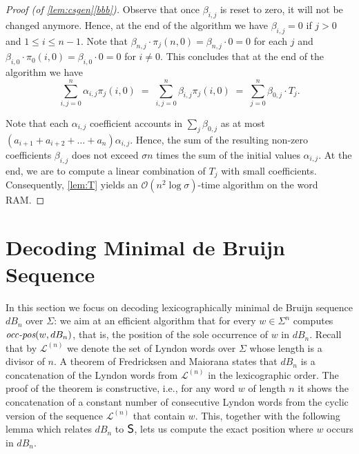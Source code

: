 \documentclass{article}
\newcommand{\mayqed}{}
\newcommand{\Oh}{\mathcal{O}}
\newcommand{\dB}{dB}
\newcommand{\occ}{\mbox{\it occ-pos}}
\renewcommand{\L}{{\mathcal{L}}}
\newcommand{\CS}{\mbox{\large{\sf{S}}}}
\theoremstyle{definition}
\theoremstyle{remark}
\begin{document}
\begin{proof}[Proof (of \cref{lem:csgen}\ref{bbb})]
  Observe that once $\beta_{i,j}$ is reset to zero, it will not be changed anymore.
  Hence, at the end of the algorithm we have $\beta_{i,j}=0$ if $j>0$ and $1\le i \le n-1$. Note that $\beta_{n,j}\cdot \pi_j(n,0)=\beta_{n,j}\cdot 0 = 0$
  for each $j$ and $\beta_{i,0}\cdot \pi_0(i,0) = \beta_{i,0} \cdot 0 = 0$ for $i\ne 0$.
  This concludes that at the end of the algorithm we have
  $$ \sum_{i,j=0}^n \alpha_{i,j} \pi_j(i,0)\;=\;\sum_{i,j=0}^n \beta_{i,j} \pi_j(i,0)\;=\;\sum_{j=0}^n\beta_{0,j}\cdot T_j.$$

  Note that each $\alpha_{i,j}$ coefficient accounts in $\sum_j \beta_{0,j}$
  as at most $(a_{i+1}+a_{i+2}+\ldots+a_{n})\alpha_{i,j}$.
  Hence, the sum of the resulting non-zero coefficients $\beta_{i,j}$
  does not exceed $\sigma n$ times the sum of the initial values $\alpha_{i,j}$.
  At the end, we are to compute a linear combination of $T_j$ with small coefficients.
  Consequently, \cref{lem:T} yields an $\Oh(n^2 \log \sigma)$-time algorithm on the word RAM.
\mayqed\end{proof}




\section{Decoding Minimal de Bruijn Sequence}\label{sec:debruijn}
In this section we focus on decoding lexicographically minimal de Bruijn sequence $\dB_n$ over $\Sigma$:
we aim at an efficient algorithm that for every $w \in \Sigma^n$ computes $\occ(w,\dB_n)$, that is,
the position of the sole occurrence of $w$ in $\dB_n$.
Recall that by $\L^{(n)}$ we denote the set of Lyndon words over $\Sigma$ whose length is a divisor of $n$.
A theorem of Fredricksen and Maiorana \cite{DBLP:journals/jct/Fredricksen70,fredricksen1978necklaces,Knuth}
states that $\dB_n$ is a concatenation of the Lyndon words from $\L^{(n)}$
in the lexicographic order.
The proof of the theorem is constructive,
i.e., for any word $w$ of length $n$ it shows the concatenation of
a constant number of consecutive Lyndon words from the cyclic version of the sequence $\L^{(n)}$ that contain $w$.
This, together with the following lemma which relates $\dB_n$ to $\CS$, lets us compute the
exact position where $w$ occurs in $\dB_n$.
\end{document}
